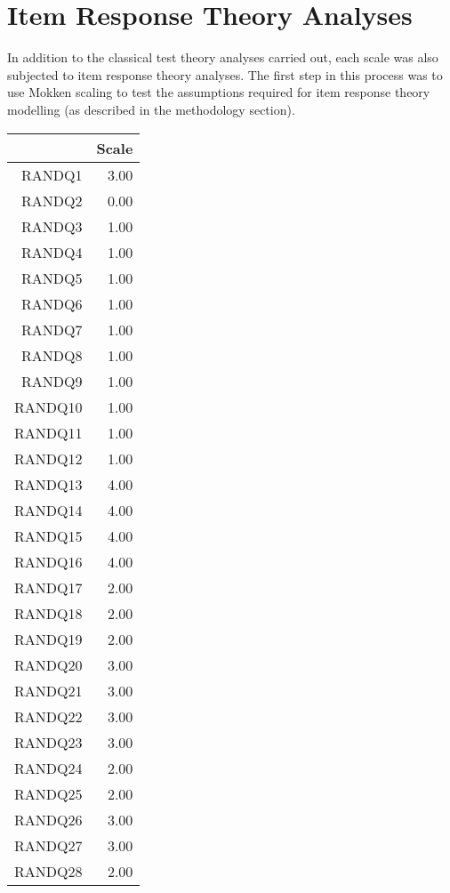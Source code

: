 \documentclass{article}
\begin{document}
 \section{Item Response Theory Analyses}
\label{sec:item-response-theory}

In addition to the classical test theory analyses carried out, each scale was also subjected to item response theory analyses.  The first step in this process was to use Mokken scaling to test the assumptions required for item response theory modelling (as described in the methodology section).



\begin{table}[ht]
\centering
\begin{tabular}{rr}
  \hline
 & Scale \\ 
  \hline
RANDQ1 & 3.00 \\ 
  RANDQ2 & 0.00 \\ 
  RANDQ3 & 1.00 \\ 
  RANDQ4 & 1.00 \\ 
  RANDQ5 & 1.00 \\ 
  RANDQ6 & 1.00 \\ 
  RANDQ7 & 1.00 \\ 
  RANDQ8 & 1.00 \\ 
  RANDQ9 & 1.00 \\ 
  RANDQ10 & 1.00 \\ 
  RANDQ11 & 1.00 \\ 
  RANDQ12 & 1.00 \\ 
  RANDQ13 & 4.00 \\ 
  RANDQ14 & 4.00 \\ 
  RANDQ15 & 4.00 \\ 
  RANDQ16 & 4.00 \\ 
  RANDQ17 & 2.00 \\ 
  RANDQ18 & 2.00 \\ 
  RANDQ19 & 2.00 \\ 
  RANDQ20 & 3.00 \\ 
  RANDQ21 & 3.00 \\ 
  RANDQ22 & 3.00 \\ 
  RANDQ23 & 3.00 \\ 
  RANDQ24 & 2.00 \\ 
  RANDQ25 & 2.00 \\ 
  RANDQ26 & 3.00 \\ 
  RANDQ27 & 3.00 \\ 
  RANDQ28 & 2.00 \\ 

\end{tabular}
\end{table}
\end{document}
